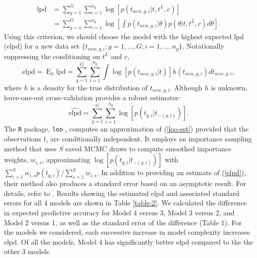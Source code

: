 \documentclass[12pt]{article}
\newcommand{\op}{\operatorname}
\begin{document}
\begin{align*}
\mbox{lpd} &= \sum_{g=1}^G \sum_{i=1}^{n_g} \log[p(t_{new,g,i}|t, t^L, c)] \\
&= \sum_{g=1}^G \sum_{i=1}^{n_g} \log \left[ \int p(t_{new,g, i}|\theta) p(\theta|t,t^L,c) d\theta \right].
\end{align*}
\noindent Using this criterion, we should choose the model with the highest expected lpd (elpd) for a new data set $\{t_{new,g,i}:g=1,\ldots,G; i=1,\ldots,n_g\}$. Notationally suppressing the conditioning on $t^L$ and $c$,
\begin{equation}
\mbox{elpd} = \op{E}_h \mbox{lpd} = \sum_{g=1}^G \sum_{i=1}^{n_g} \int \log [p(t_{new, g, i}|t)] h(t_{new,g,i}) d t_{new,g,i},
\label{elpd}
\end{equation}
where $h$ is a density for the true distribution of $t_{new,g,i}$. Although $h$ is unknown, leave-one-out cross-validation provides a robust estimator:
\begin{equation}
\widehat{\text{elpd}} = \sum_{g=1}^G \sum_{i=1}^{n_g} \log [p(t_{g,i}|t_{-(g,i)})].
\label{loo-est}
\end{equation}
The \texttt{R} package, \texttt{loo} \citep{loo}, computes an approximation of (\ref{loo-est}) provided that the observations $t_i$ are conditionally independent. It employs an importance sampling method that uses $S$ saved MCMC draws to compute smoothed importance weights, $w_{i,s}$, approximating $\log [p(t_{g,i}|t_{-(g,i)})]$ with $\sum_{i=1}^S w_{i,s} p(t_{g,i})/\sum_{s=1}^S w_{i,s}$. In addition to providing an estimate of (\ref{elpd}), their method also produces a standard error based on an asymptotic result. For details, refer to \cite{vehtari}.
Results showing the estimated elpd and associated standard errors for all 4 models are shown in Table \ref{table:2}.
 We calculated the difference in expected predictive accuracy for Model 4 versus 3, Model 3 versus 2, and Model 2 versus 1, as well as the standard error of the difference (Table 1). For the models we considered, each successive increase in model complexity increases elpd.  Of all the models, Model 4 has significantly better elpd compared to the the other 3 models.
\end{document}
